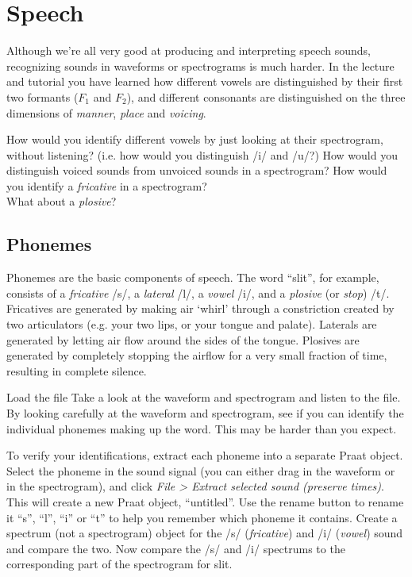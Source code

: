 \documentclass[a4paper, 9pt]{article}
\begin{document}
\section{Speech}\label{speech}

Although we're all very good at producing and interpreting speech sounds, recognizing sounds in waveforms or spectrograms is much harder. In the lecture and tutorial you have learned how different vowels are distinguished by their first two formants ($F_1$ and $F_2$), and different consonants are distinguished on the three dimensions of \emph{manner}, \emph{place} and \emph{voicing}.

\begin{exercise}
\askstar How would you identify different vowels by just looking at their spectrogram, without listening? (i.e. how would you distinguish /i/ and /u/?)
\askstar How would you distinguish voiced sounds from unvoiced sounds in a spectrogram?
\askstar How would you identify a \emph{fricative} in a spectrogram? \\
What about a \emph{plosive}?
\end{exercise}


\subsection{Phonemes}\label{phonemes}
Phonemes are the basic components of speech. The word ``slit'', for
example, consists of a \emph{fricative} /s/, a \emph{lateral} /l/, a \emph{vowel} /i/, and a \emph{plosive} (or \emph{stop}) /t/. Fricatives are generated by making air `whirl' through a constriction created by two articulators (e.g. your two lips, or your tongue and palate). Laterals are generated by letting air flow around the sides of the tongue. Plosives are generated by completely stopping the airflow for a very small fraction of time, resulting in complete silence.

\begin{exercise}
\action Load the file 
\action Take a look at the waveform and spectrogram and listen to the file.
\action By looking carefully at the waveform and spectrogram, see if you can
identify the individual phonemes making up the word. This may be harder
than you expect.
\end{exercise}

\begin{exercise}
\action To verify your identifications, extract each phoneme into a separate Praat object. Select the phoneme in the sound signal (you can either drag in the waveform or in the spectrogram), and click \emph{File > Extract selected sound (preserve times)}. This will create a new Praat object, ``untitled''. Use the rename button to rename it ``s'', ``l'', ``i'' or ``t'' to help you remember which phoneme it contains. 
\action Create a spectrum (not a spectrogram) object for the /s/ (\emph{fricative}) and /i/ (\emph{vowel}) sound and compare the two.
\action Now compare the /s/ and /i/ spectrums to the corresponding part of the spectrogram for slit. 
\end{exercise}
\end{document}
